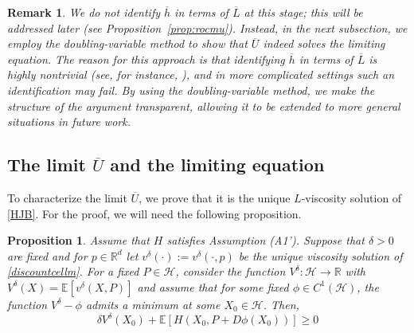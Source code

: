 \documentclass[reqno,11pt]{amsart}
\newtheorem{proposition}[theorem]{Proposition}
\newtheorem{remark}[theorem]{Remark}
\numberwithin{equation}{section}
\newcommand{\be}{\begin{equation}}
\newcommand{\ee}{\end{equation}}
\newcommand{\R}{\mathbb{R}} %
\renewcommand{\bar}{\overline}
\begin{document}
\begin{remark}
    We do not identify $\bar{h}$ in terms of $\bar{L}$ at this stage; this will be addressed later (see Proposition~\ref{prop:rocmu}). Instead, in the next subsection, we employ the doubling-variable method to show that $\bar{U}$ indeed solves the limiting equation. The reason for this approach is that identifying $\bar{h}$ in terms of $\bar{L}$ is highly nontrivial (see, for instance, \cite{LionsPapaVara1987,Weinan1991}), and in more complicated settings such an identification may fail. By using the doubling-variable method, we make the structure of the argument transparent, allowing it to be extended to more general situations in future work.
\end{remark}




\subsection{The limit $\overline{U}$ and the limiting equation}\label{charoflimit}

To characterize the limit $\overline{U}$, we prove that it is the unique $L$-viscosity solution of \eqref{HJB}. For the proof, we will need the following proposition.

\begin{proposition}\label{supersolution}
Assume that $H$ satisfies Assumption (A1'). Suppose that $\delta>0$ are fixed and for $p\in \R^d$ let $v^\delta(\cdot):=v^{\delta}(\cdot, p)$ be the unique viscosity solution of \eqref{discountcellm}.
For a fixed $P\in\mathcal{H}$, consider the function $V^\delta\colon \mathcal{H}\to \R$ with $V^\delta(X)=\mathbb{E}\left[ v^\delta(X,P)\right]$ and assume that for some fixed $\phi\in C^1(\mathcal{H})$, the function $V^\delta -\phi$ admits a minimum at some $X_0\in \mathcal{H}$. Then,
\be \label{strict supersol}
\delta V^\delta(X_0)+\mathbb{E}\left[ H( X_0,P+D\phi(X_0))   \right]\ge 0
\ee
\end{proposition}
\end{document}

